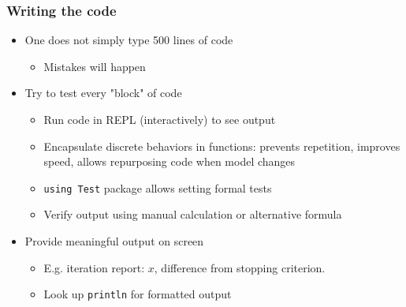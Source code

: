 \documentclass[bigger]{beamer}
\begin{document}
\begin{frame}
\frametitle{Writing the code}

\begin{itemize}
\item One does not simply type 500 lines of code

\begin{itemize}
\item Mistakes will happen
\end{itemize}

\item Try to test every "block" of code

\begin{itemize}
\item Run code in REPL (interactively) to see output

\item Encapsulate discrete behaviors in functions: prevents repetition, improves speed, allows repurposing code when model changes

\item \texttt{using Test} package allows setting formal tests

\item Verify output using manual calculation or alternative formula
\end{itemize}

\item Provide meaningful output on screen

\begin{itemize}
\item E.g. iteration report: $x$, difference from stopping criterion.

\item Look up \texttt{println} for formatted output
\end{itemize}
\end{itemize}

\end{frame}
\end{document}
